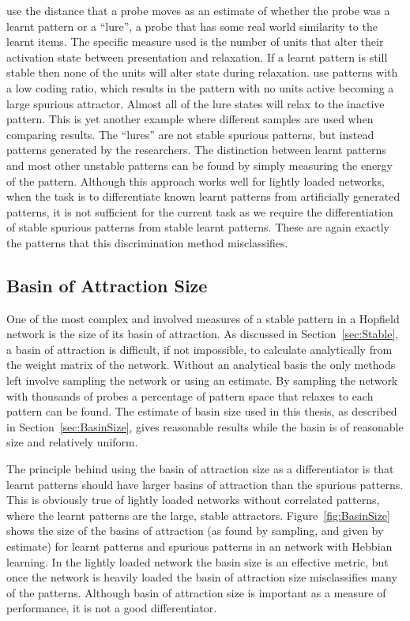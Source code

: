 \citet{OReilly1998} use the distance that a probe moves as an estimate of whether the probe was a learnt pattern or a ``lure'', a probe that has some real world similarity to the learnt items.  The specific measure used is the number of units that alter their activation state between presentation and relaxation.  If a learnt pattern is still stable then none of the units will alter state during relaxation.  \citeauthor{OReilly1998} use patterns with a low coding ratio, which results in the pattern with no units active becoming a large spurious attractor. Almost all of the lure states will relax to the inactive pattern.  This is yet another example where different samples are used when comparing results.  The ``lures'' are not stable spurious patterns, but instead patterns generated by the researchers.  The distinction between learnt patterns and most other unstable patterns can be found by simply measuring the energy of the pattern.  Although this approach works well for lightly loaded networks, when the task is to differentiate known learnt patterns from artificially generated patterns, it is not sufficient for the current task as we require the differentiation of stable spurious patterns from stable learnt patterns. These are again exactly the patterns that this discrimination method misclassifies.

\subsection{Basin of Attraction Size}
\label{sec:BasinSizeTest}

One of the most complex and involved measures of a stable pattern in a Hopfield network is the size of its basin of attraction.  As discussed in Section~\ref{sec:Stable}, a basin of attraction is difficult, if not impossible, to calculate analytically from the weight matrix of the network.  Without an analytical basis the only methods left involve sampling the network or using an estimate.  By sampling the network with thousands of probes a percentage of pattern space that relaxes to each pattern can be found. The estimate of basin size used in this thesis, as described in Section~\ref{sec:BasinSize}, gives reasonable results while the basin is of reasonable size and relatively uniform.

The principle behind using the basin of attraction size as a differentiator is that learnt patterns should have larger basins of attraction than the spurious patterns.  This is obviously true of lightly loaded networks without correlated patterns, where the learnt patterns are the large, stable attractors.  Figure~\ref{fig:BasinSize} shows the size of the basins of attraction (as found by sampling, and given by estimate) for learnt patterns and spurious patterns in an  network with Hebbian learning.  In the lightly loaded network the basin size is an effective metric, but once the network is heavily loaded the basin of attraction size misclassifies many of the patterns. Although basin of attraction size is important as a measure of performance, it is not a good differentiator.  

